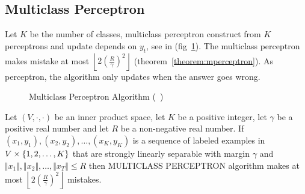 \subsection{Multiclass Perceptron}
Let $K$ be the number of classes, multiclass perceptron construct from $K$ perceptrons
and update depends on $y_t$, see in (fig~\ref{fig:alg-mperceptron}). 
The multiclass perceptron makes mistake at most $\left\lfloor 2\left( \frac{R}{\gamma} \right)^2\right\rfloor$ (theorem~\ref{theorem:mperceptron}).
As perceptron, the algorithm only updates when the answer goes wrong.
\begin{figure}[hbt!]
  \begin{algorithm}[H]
    \SetAlgoLined
    \DontPrintSemicolon
  \end{algorithm}
  \caption{Multiclass Perceptron Algorithm (~\cite{CrammerS2003-ultraconservative})}
  \label{fig:alg-mperceptron}
\end{figure}

\begin{theorem}
\label{theorem:mperceptron}
Let $(V,\cdot,\cdot)$ be an inner product space, let $K$ be a
positive integer, let $\gamma$ be a positive real number and let $R$ be a non-negative real number. If $(x_1,y_1),(x_2,y_2),\dots,(x_K,y_K)$
is a sequence of labeled examples in $V\times\{1,2,\dots,K\}$ that are strongly linearly separable with margin $\gamma$ and
$\Vert x_1\Vert ,\Vert x_2\Vert ,\dots,\Vert x_T \Vert\leq R$ then MULTICLASS PERCEPTRON algorithm makes at most $\left\lfloor 2\left( \frac{R}{\gamma} \right)^2\right\rfloor$ mistakes.
\end{theorem}


